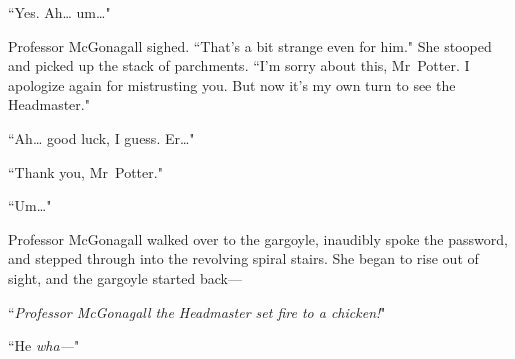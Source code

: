 ``Yes. Ah{\ldots} um{\ldots}"

Professor McGonagall sighed. ``That's a bit strange even for him." She stooped and picked up the stack of parchments. ``I'm sorry about this, Mr~Potter. I apologize again for mistrusting you. But now it's my own turn to see the Headmaster."

``Ah{\ldots} good luck, I guess. Er{\ldots}"

``Thank you, Mr~Potter."

``Um{\ldots}"

Professor McGonagall walked over to the gargoyle, inaudibly spoke the password, and stepped through into the revolving spiral stairs. She began to rise out of sight, and the gargoyle started back—

``\emph{Professor McGonagall the Headmaster set fire to a chicken!}"

``He \emph{wha—}"

